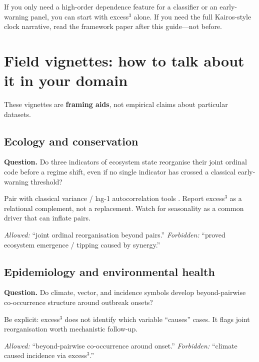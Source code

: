 \documentclass[11pt,a4paper]{article}
\begin{document}
\begin{keyidea}
If you only need a high-order dependence feature for a classifier or an
early-warning panel, you can start with excess$^3$ alone. If you need the
full Kairos-style clock narrative, read the framework paper after this
guide---not before.
\end{keyidea}

\section{Field vignettes: how to talk about it in your domain}
\label{sec:fields}

These vignettes are \textbf{framing aids}, not empirical claims about
particular datasets.

\subsection{Ecology and conservation}

\begin{fieldbox}
\textbf{Question.} Do three indicators of ecosystem state reorganise their
joint ordinal code before a regime shift, even if no single indicator has
crossed a classical early-warning threshold?
\end{fieldbox}
Pair with classical variance / lag-1 autocorrelation tools
\citep{Scheffer2009,Dakos2012}. Report excess$^3$ as a relational complement,
not a replacement. Watch for seasonality as a common driver that can inflate
pairs.
\par\noindent\textit{Allowed:} ``joint ordinal reorganisation beyond pairs.''
\textit{Forbidden:} ``proved ecosystem emergence / tipping caused by synergy.''

\subsection{Epidemiology and environmental health}

\begin{fieldbox}
\textbf{Question.} Do climate, vector, and incidence symbols develop
beyond-pairwise co-occurrence structure around outbreak onsets?
\end{fieldbox}
Be explicit: excess$^3$ does not identify which variable ``causes'' cases.
It flags joint reorganisation worth mechanistic follow-up.
\par\noindent\textit{Allowed:} ``beyond-pairwise co-occurrence around onset.''
\textit{Forbidden:} ``climate caused incidence via excess$^3$.''
\end{document}

